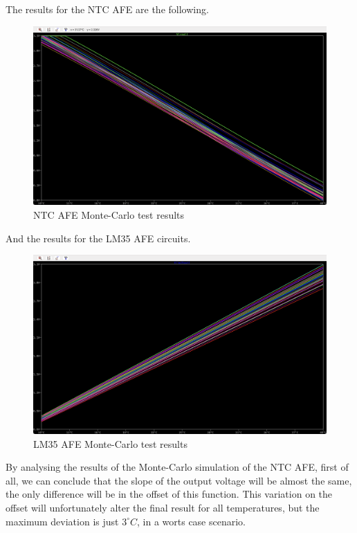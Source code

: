 \documentclass[12pt]{article}
\begin{document}
    The results for the NTC AFE are the following.

    \begin{figure}[H]
        \centering
        \includegraphics*[scale = 0.3]{images/montecarlo ntc.png}
        \caption{NTC AFE Monte-Carlo test results}
        \label{wrap-fig:1}
    \end{figure}

    And the results for the LM35 AFE circuits.

    \begin{figure}[H]
        \centering
        \includegraphics*[scale = 0.3]{images/montecarlo lm35.png}
        \caption{LM35 AFE Monte-Carlo test results}
        \label{wrap-fig:1}
    \end{figure}

    By analysing the results of the Monte-Carlo simulation of the NTC AFE, first of all, we can conclude that the
    slope of the output voltage will be almost the same, the only difference will be in the offset of this function.
    This variation on the offset will unfortunately alter the final result for all temperatures, but the maximum deviation is just  $3^\circ C$, in a worts case scenario.
\end{document}
